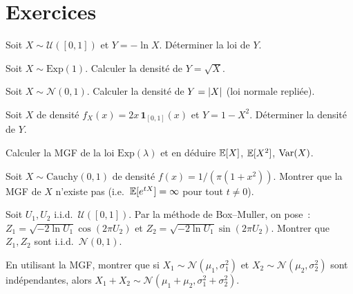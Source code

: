 \section{Exercices}

\begin{exercice}
Soit $X \sim \mathcal{U}([0,1])$ et $Y = -\ln X$. D\'eterminer la loi de $Y$.
\end{exercice}

\begin{exercice}
Soit $X \sim \text{Exp}(1)$. Calculer la densit\'e de $Y = \sqrt{X}$.
\end{exercice}

\begin{exercice}
Soit $X \sim \mathcal{N}(0,1)$. Calculer la densit\'e de $Y = \left| X \right|$
(loi normale repli\'ee).
\end{exercice}

\begin{exercice}
Soit $X$ de densit\'e $f_X(x) = 2x\, \mathbf{1}_{[0,1]}(x)$ et $Y = 1 - X^2$.
D\'eterminer la densit\'e de $Y$.
\end{exercice}

\begin{exercice}
Calculer la MGF de la loi $\text{Exp}(\lambda)$ et en d\'eduire $\mathbb{E}[X]$, $\mathbb{E}[X^2]$,
$\mathrm{Var}(X)$.
\end{exercice}

\begin{exercice}
Soit $X \sim \text{Cauchy}(0,1)$ de densit\'e $f(x) = 1/(\pi(1+x^2))$.
Montrer que la MGF de $X$ n'existe pas (i.e.\ $\mathbb{E}[e^{tX}] = \infty$ pour
tout $t \neq 0$).
\end{exercice}

\begin{exercice}
Soit $U_1, U_2$ i.i.d.\ $\mathcal{U}([0,1])$. Par la m\'ethode de Box--Muller,
on pose~:
$Z_1 = \sqrt{-2\ln U_1} \cos(2\pi U_2)$ et
$Z_2 = \sqrt{-2\ln U_1} \sin(2\pi U_2)$.
Montrer que $Z_1, Z_2$ sont i.i.d.\ $\mathcal{N}(0,1)$.
\end{exercice}

\begin{exercice}
En utilisant la MGF, montrer que si $X_1 \sim \mathcal{N}(\mu_1, \sigma_1^2)$ et
$X_2 \sim \mathcal{N}(\mu_2, \sigma_2^2)$ sont ind\'ependantes, alors
$X_1 + X_2 \sim \mathcal{N}(\mu_1 + \mu_2, \sigma_1^2 + \sigma_2^2)$.
\end{exercice}
